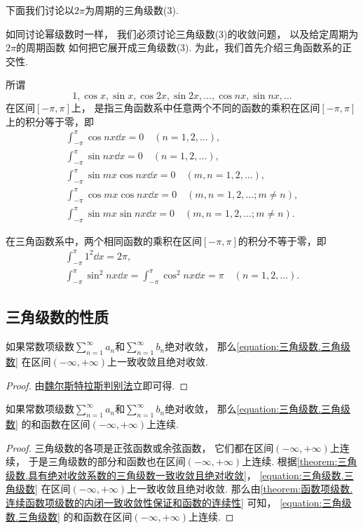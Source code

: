 下面我们讨论以\(2\pi\)为周期的三角级数(3).

如同讨论幂级数时一样，
我们必须讨论三角级数(3)的收敛问题，
以及给定周期为\(2\pi\)的周期函数%
如何把它展开成三角级数(3).
为此，我们首先介绍三角函数系的正交性.

\begin{definition}
所谓\[
1, \cos x, \sin x, \cos 2x, \sin 2x, \dotsc, \cos nx, \sin nx, \dotsc
\]在区间\([-\pi,\pi]\)上，
是指三角函数系中任意两个不同的函数的乘积在区间\([-\pi,\pi]\)上的积分等于零，即
\begin{gather*}
	\int_{-\pi}^\pi \cos{nx} \dd{x} = 0 \quad(n=1,2,\dotsc), \\
	\int_{-\pi}^\pi \sin{nx} \dd{x} = 0 \quad(n=1,2,\dotsc), \\
	\int_{-\pi}^\pi \sin{mx}\cos{nx} \dd{x} = 0 \quad(m,n=1,2,\dotsc), \\
	\int_{-\pi}^\pi \cos{mx}\cos{nx} \dd{x} = 0 \quad(m,n=1,2,\dotsc; m \neq n), \\
	\int_{-\pi}^\pi \sin{mx}\sin{nx} \dd{x} = 0 \quad(m,n=1,2,\dotsc; m \neq n).
\end{gather*}

在三角函数系中，两个相同函数的乘积在区间\([-\pi,\pi]\)的积分不等于零，即
\begin{gather*}
\int_{-\pi}^\pi 1^2 \dd{x} = 2\pi, \\
\int_{-\pi}^\pi \sin^2 nx \dd{x} = \int_{-\pi}^\pi \cos^2 nx \dd{x} = \pi \quad(n=1,2,\dotsc).
\end{gather*}
\end{definition}

\subsection{三角级数的性质}
\begin{property}\label{theorem:三角级数.具有绝对收敛系数的三角级数一致收敛且绝对收敛}
如果常数项级数\(\sum_{n=1}^\infty a_n\)和\(\sum_{n=1}^\infty b_n\)绝对收敛，
那么\cref{equation:三角级数.三角级数} 在区间\((-\infty,+\infty)\)上一致收敛且绝对收敛.
\begin{proof}
由\hyperref[theorem:无穷级数.魏尔斯特拉斯判别法]{魏尔斯特拉斯判别法}立即可得.
\end{proof}
\end{property}

\begin{property}
如果常数项级数\(\sum_{n=1}^\infty a_n\)和\(\sum_{n=1}^\infty b_n\)绝对收敛，
那么\cref{equation:三角级数.三角级数} 的和函数在区间\((-\infty,+\infty)\)上连续.
\begin{proof}
三角级数的各项是正弦函数或余弦函数，
它们都在区间\((-\infty,+\infty)\)上连续，
于是三角级数的部分和函数也在区间\((-\infty,+\infty)\)上连续.
根据\cref{theorem:三角级数.具有绝对收敛系数的三角级数一致收敛且绝对收敛}，
\cref{equation:三角级数.三角级数} 在区间\((-\infty,+\infty)\)上一致收敛且绝对收敛.
那么由\cref{theorem:函数项级数.连续函数项级数的内闭一致收敛性保证和函数的连续性} 可知，
\cref{equation:三角级数.三角级数} 的和函数在区间\((-\infty,+\infty)\)上连续.
\end{proof}
\end{property}

